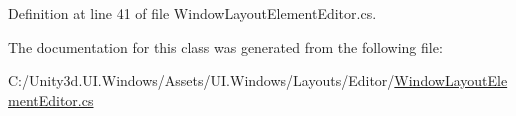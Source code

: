 Definition at line 41 of file Window\+Layout\+Element\+Editor.\+cs.



The documentation for this class was generated from the following file\+:\begin{DoxyCompactItemize}
\item 
C\+:/\+Unity3d.\+U\+I.\+Windows/\+Assets/\+U\+I.\+Windows/\+Layouts/\+Editor/\hyperlink{_window_layout_element_editor_8cs}{Window\+Layout\+Element\+Editor.\+cs}\end{DoxyCompactItemize}

